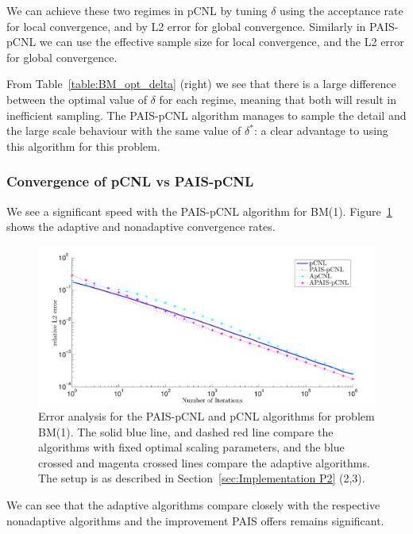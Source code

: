 \documentclass[final]{siamltex}
\begin{document}
We can achieve these two regimes in pCNL by tuning $\delta$ using the acceptance rate for local convergence, and by L2 error for global convergence. Similarly in PAIS-pCNL we can use the effective sample size for local convergence, and the L2 error for global convergence.

From Table~\ref{table:BM_opt_delta} (right) we see that there is a large difference between the optimal value of $\delta$ for each regime, meaning that both will result in inefficient sampling. The PAIS-pCNL algorithm manages to sample the detail and the large scale behaviour with the same value of $\delta^*$: a clear advantage to using this algorithm for this problem.

\subsubsection{Convergence of pCNL vs PAIS-pCNL}

We see a significant speed with the PAIS-pCNL algorithm for BM(1). Figure~\ref{fig:BM1_L2} shows the adaptive and nonadaptive convergence rates. 

\begin{figure}[htpb]
\begin{center}
\includegraphics[width=\textwidth]{"figures/BM1_L2"}
\caption{Error analysis for the PAIS-pCNL and pCNL algorithms for
  problem BM(1). The solid blue line, and dashed red line compare the algorithms with fixed optimal scaling parameters, and the blue crossed and magenta crossed lines compare the adaptive algorithms. The setup is as described in Section~\ref{sec:Implementation P2} (2,3).}
\label{fig:BM1_L2}
\end{center}
\end{figure}

We can see that the adaptive algorithms compare closely with the
respective nonadaptive algorithms and the improvement PAIS offers
remains significant.
\end{document}
